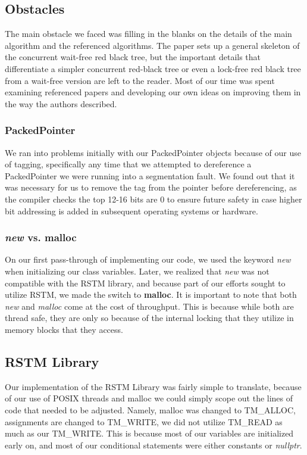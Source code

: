 \documentclass[letterpaper, 10 pt, conference]{ieeeconf}
\begin{document}
\subsection{Obstacles}

The main obstacle we faced was filling in the blanks on the details of the main algorithm and the referenced algorithms. The paper sets up a general skeleton of the concurrent wait-free red black tree, but the important details that differentiate a simpler concurrent red-black tree or even a lock-free red black tree from a wait-free version are left to the reader. Most of our time was spent examining referenced papers and developing our own ideas on improving them in the way the authors described.

\subsubsection{PackedPointer}
We ran into problems initially with our PackedPointer objects because of our use of tagging, specifically any time that we attempted to dereference a PackedPointer we were running into a segmentation fault. We found out that it was necessary for us to remove the tag from the pointer before dereferencing, as the compiler checks the top 12-16 bits are 0 to ensure future safety in case higher bit addressing is added in subsequent operating systems or hardware.

\subsubsection{\textit{new} vs. malloc}
On our first pass-through of implementing our code, we used the keyword \textit{new} when initializing our class variables. Later, we realized that \textit{new} was not compatible with the RSTM library, and because part of our efforts sought to utilize RSTM, we made the switch to \textbf{malloc}. It is important to note that both \textit{new} and \textit{malloc} come at the cost of throughput. This is because while both are thread safe, they are only so because of the internal locking that they utilize in memory blocks that they access.
	
\subsection{RSTM Library}
Our implementation of the RSTM Library was fairly simple to translate, because of our use of POSIX threads and malloc we could simply scope out the lines of code that needed to be adjusted. Namely, malloc was changed to TM\_ALLOC, assignments are changed to TM\_WRITE, we did not utilize TM\_READ as much as our TM\_WRITE. This is because most of our variables are initialized early on, and most of our conditional statements were either constants or \textit{nullptr}.
\end{document}

